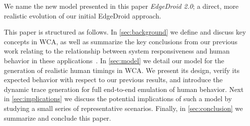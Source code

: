 We name the new model presented in this paper \emph{EdgeDroid \num{2.0}}; a direct, more realistic evolution of our initial EdgeDroid approach.

This paper is structured as follows.
In \cref{sec:background} we define and discuss key concepts in \ac{WCA}, as well as summarize the key conclusions from our previous work relating to the relationship between system responsiveness and human behavior in these applications~\cite{olguinmunoz:impact2021}.
In \cref{sec:model} we detail our model for the generation of realistic human timings in \ac{WCA}.
We present its design, verify its expected behavior with respect to our previous results, and introduce the dynamic trace generation for full end-to-end emulation of human behavior.
Next in \cref{sec:implications} we discuss the potential implications of such a model by studying a small series of representative scenarios.
Finally, in \cref{sec:conclusion} we summarize and conclude this paper.